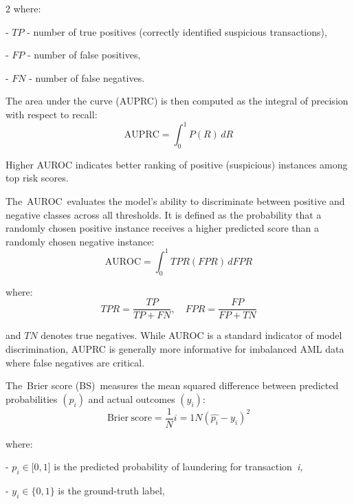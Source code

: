 \begin{multicols}{2}
where:

- \(TP\) - number of true positives (correctly identified suspicious
transactions),

- \(FP\) - number of false positives,

- \(FN\) - number of false negatives.

The area under the curve (AUPRC) is then computed as the integral of
precision with respect to recall:
\vspace{-0.5em}
\begin{equation}
\text{AUPRC} = \int_{0}^{1}{P(R)}\, dR
\end{equation}

Higher AUROC indicates better ranking of positive (suspicious) instances
among top risk scores.

The~AUROC~evaluates the model's ability to discriminate between positive
and negative classes across all thresholds. It is defined as the
probability that a randomly chosen positive instance receives a higher
predicted score than a randomly chosen negative instance:
\vspace{-0.5em}
\begin{equation}
\text{AUROC} = \int_{0}^{1}{TPR(FPR)}\, dFPR
\end{equation}

where:
\vspace{-0.5em}
\begin{equation}
TPR = \frac{TP}{TP + FN},\quad FPR = \frac{FP}{FP + TN}
\end{equation}

and \(TN\) denotes true negatives. While AUROC is a standard indicator
of model discrimination, AUPRC is generally more informative for
imbalanced AML data where false negatives are critical.

The~Brier score (BS)~measures the mean squared difference
between predicted probabilities \((p_{i})\) and actual outcomes
\((y_{i})\):
\vspace{-0.5em}
\begin{equation}
\text{Brier score} = \frac{1}{N}i = 1N\left( \widehat{p_{i}} - y_{i} \right)^{2}
\end{equation}

where:

- \(p_{i} \in \lbrack 0,1\rbrack\) is the predicted probability of
laundering for transaction~\emph{i,}

- \(y_{i} \in \text{\{}0,1\text{\}}\) is the ground-truth label,


\end{multicols}
